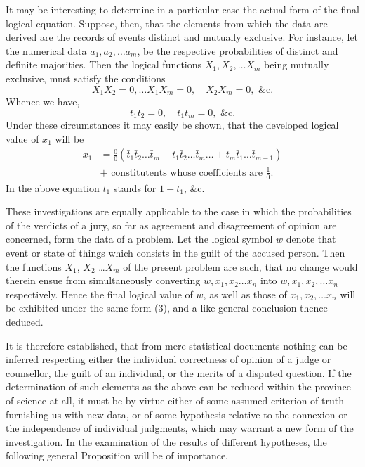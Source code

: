 \documentclass[oneside]{book}
\begin{document}
It may be interesting to determine in a particular case the
actual form of the final logical equation. Suppose, then, that the
elements from which the data are derived are the records of
events distinct and mutually exclusive. For instance, let the
numerical data $a_1, a_2, \dotsc a_m$, be the respective probabilities of
distinct and definite majorities. Then the logical functions
$X_1, X_2, \dotsc X_m$ being mutually exclusive, must satisfy the conditions
\[
  X_1 X_2 = 0,\dotsc X_1 X_m = 0,\quad X_2 X_m = 0, \text{ \&c.}
\]
Whence we have,
\[
  t_1 t_2 = 0,\quad  t_1 t_m = 0, \text{ \&c.}
\]
Under these circumstances it may easily be shown, that the
developed logical value of $x_1$ will be
\begin{equation*}\begin{split}
x_1&=\frac{0}{0}(\bar{t}_1 \bar{t}_2 \dotsc \bar{t}_m + t_1 \bar{t}_2 \dotsc \bar{t}_m \dotsc + t_m \bar{t}_1\dotsc \bar{t}_{m-1}) \\
& + \text{ constitutents whose coefficients are }\frac{1}{0}.
\end{split}\end{equation*}
In the above equation $\bar{t}_1$ stands for $1-t_1$, \&c.

These investigations are equally applicable to the case in
which the probabilities of the verdicts of a jury, so far as
agreement and disagreement of opinion are concerned, form the data
of a problem. Let the logical symbol $w$ denote that event or
state of things which consists in the guilt of the accused person.
Then the functions $X_1$, $X_2$ \dots $X_m$ of the present problem are
such, that no change would therein ensue from simultaneously
converting $w, x_1, x_2 \dotsc x_n$ into $\bar{w}, \bar{x}_1, \bar{x}_2,\dotsc \bar{x}_n$ respectively.
Hence the final logical value of $w$, as well as those of $x_1, x_2, \dotsc x_n$
will be exhibited under the same form (3), and a like general
conclusion thence deduced.

It is therefore established, that from mere statistical
documents nothing can be inferred respecting either the individual
correctness of opinion of a judge or counsellor, the guilt of an
individual, or the merits of a disputed question. If the determination
of such elements as the above can be reduced within
the province of science at all, it must be by virtue either of
some assumed criterion of truth furnishing us with new data, or
of some hypothesis relative to the connexion or the independence
of individual judgments, which may warrant a new form of the
investigation. In the examination of the results of different
hypotheses, the following general Proposition will be of importance.
\end{document}
